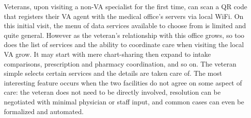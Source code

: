 Veterans, upon visiting a non-VA specialist for the first time, can scan a QR code that registers their \projectName VA agent with the medical office's servers via local WiFi. On this initial visit, the menu of data services available to choose from is limited and quite general.
However as the veteran's relationship with this office grows, so too does the list of services and the ability to coordinate care when visiting the local VA grow.
It may start with mere chart-sharing then expand to intake comparisons, prescription and pharmacy coordination, and so on.
The veteran simple selects certain services and the details are taken care of.
The most interesting feature occurs when the two facilities do not agree on some aspect of care: the veteran does not need to be directly involved, resolution can be negotiated with minimal physician or staff input, and common cases can even be formalized and automated.
